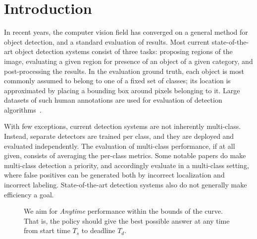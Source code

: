 \section{Introduction}

In recent years, the computer vision field has converged on a general method for object detection, and a standard evaluation of results.
Most current state-of-the-art object detection systems consist of three tasks: proposing regions of the image, evaluating a given region for presence of an object of a given category, and post-processing the results.
In the evaluation ground truth, each object is most commonly assumed to belong to one of a fixed set of classes; its location is approximated by placing a bounding box around pixels belonging to it.
Large datasets of such human annotations are used for evaluation of detection algorithms~\cite{pascal-voc-2010,imagenet_cvpr09}.

With few exceptions, current detection systems are not inherently multi-class.
Instead, separate detectors are trained per class, and they are deployed and evaluated independently.
The evaluation of multi-class performance, if at all given, consists of averaging the per-class metrics.
Some notable papers do make multi-class detection a priority, and accordingly evaluate in a multi-class setting, where false positives can be generated both by incorrect localization and incorrect labeling.
State-of-the-art detection systems also do not generally make efficiency a goal.

\begin{figure}[ht!]
  \caption{We aim for \emph{Anytime} performance within the bounds of the curve. That is, the policy should give the best possible answer at any time from start time $T_s$ to deadline $T_d$.}
  \label{fig:evaluation}
\end{figure}

